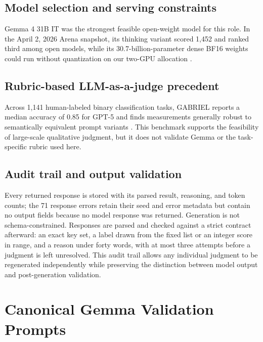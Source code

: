 \documentclass[10pt,twocolumn]{article}
\begin{document}
\subsection{Model selection and serving constraints}
\label{app:gemma-selection}

Gemma 4 31B IT was the strongest feasible open-weight model for this role. In
the April 2, 2026 Arena snapshot, its thinking variant scored 1,452 and ranked
third among open models, while its 30.7-billion-parameter dense BF16 weights
could run without quantization on our two-GPU allocation
\citep{arena2026leaderboard,google2026gemma4}.

\subsection{Rubric-based LLM-as-a-judge precedent}
\label{app:llm-judge}

Across 1,141 human-labeled binary classification tasks, GABRIEL reports a
median accuracy of 0.85 for GPT-5 and finds measurements generally robust to
semantically equivalent prompt variants \citep{asirvatham2026gptmeasurement}.
This benchmark supports the feasibility of large-scale qualitative judgment,
but it does not validate Gemma or the task-specific rubric used here.

\subsection{Audit trail and output validation}
\label{app:audit-trail}

Every returned response is stored with its parsed result, reasoning, and token
counts; the 71 response errors retain their seed and error metadata but
contain no output fields because no model response was returned. Generation is
not schema-constrained. Responses are parsed and checked against a strict
contract afterward: an exact key set, a label drawn from the fixed list or an
integer score in range, and a reason under forty words, with at most three
attempts before a judgment is left unresolved. This audit trail allows any
individual judgment to be regenerated independently while preserving the
distinction between model output and post-generation validation.

\section{Canonical Gemma Validation Prompts}
\label{app:gemma-prompts}
\end{document}
